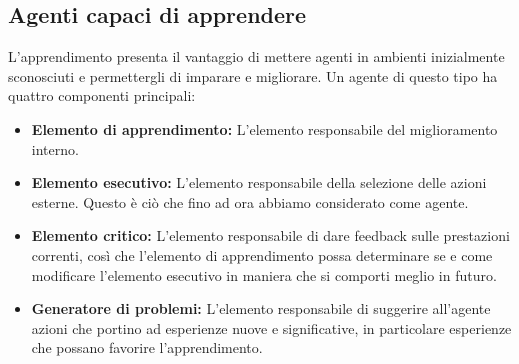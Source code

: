     \subsection{Agenti capaci di apprendere}
        L'apprendimento presenta il vantaggio di mettere agenti in ambienti inizialmente sconosciuti e permettergli di imparare e migliorare. Un agente di questo tipo ha quattro componenti principali:
        \begin{itemize}
            \item \textbf{Elemento di apprendimento:} L'elemento responsabile del miglioramento interno.
            \item \textbf{Elemento esecutivo:} L'elemento responsabile della selezione delle azioni esterne. Questo è ciò che fino ad ora abbiamo considerato come agente.
            \item \textbf{Elemento critico:} L'elemento responsabile di dare feedback sulle prestazioni correnti, così che l'elemento di apprendimento possa determinare se e come modificare l'elemento esecutivo in maniera che si comporti meglio in futuro.
            \item \textbf{Generatore di problemi:} L'elemento responsabile di suggerire all'agente azioni che portino ad esperienze nuove e significative, in particolare esperienze che possano favorire l'apprendimento.
        \end{itemize}